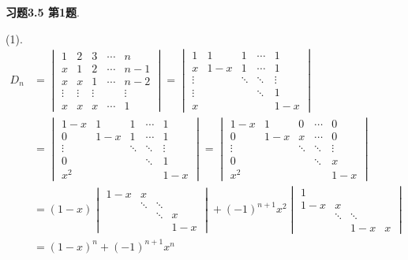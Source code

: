 \renewcommand{\newpageorvspace}{\vspace{2em}}

\date{第九次作业}



\maketitle

{\bf 习题3.5 第1题}.

(1). 
\begin{align*}
D_n & = \begin{vmatrix} 1 & 2 & 3 & \cdots & n \\ x & 1 & 2 & \cdots & n-1 \\ x & x & 1 & \cdots & n-2 \\ \vdots & \vdots & \vdots & & \vdots \\ x & x & x & \cdots & 1 \end{vmatrix} = \begin{vmatrix} 1 & 1 & 1 & \cdots & 1 \\ x & 1-x & 1 & \cdots & 1 \\ \vdots & & \ddots & \ddots & \vdots \\ \vdots & & & \ddots & 1 \\ x & & & & 1-x \end{vmatrix} \\
& = \begin{vmatrix} 1-x & 1 & 1 & \cdots & 1 \\ 0 & 1-x & 1 & \cdots & 1 \\ \vdots & & \ddots & \ddots & \vdots \\ 0 & & & \ddots & 1 \\ x^2 & & & & 1-x \end{vmatrix} = \begin{vmatrix} 1-x & 1 & 0 & \cdots & 0 \\ 0 & 1-x & x & \cdots & 0 \\ \vdots & & \ddots & \ddots & \vdots \\ 0 & & & \ddots & x \\ x^2 & & & & 1-x \end{vmatrix} \\
& = (1-x) \begin{vmatrix} 1-x & x & & \\ & \ddots & \ddots & \\ & & \ddots & x \\ & & & 1-x \end{vmatrix} + (-1)^{n+1}x^2 \begin{vmatrix} 1 & & & \\ 1-x & x & & \\ & \ddots & \ddots & \\ & & 1-x & x \end{vmatrix} \\
& = (1-x)^n + (-1)^{n+1}x^n
\end{align*}

